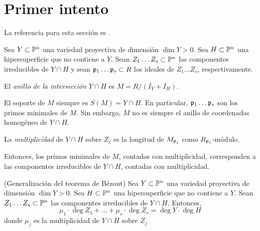 \section{Primer intento}

\noindent La referencia para esta sección es \cite[pp. 53-54]{hartshorne}.

\begin{preliminaries}
Sea $Y \subset \P^n$ una variedad proyectiva de dimensión $\dim Y > 0$. Sea $H \subset \P^n$ una hipersuperficie que no contiene a $Y$. Sean $Z_1 \dots Z_s \subset \P^n$ las componentes irreducibles de $Y \cap H$ y sean $\p_1 \dots \p_s \subset R$ los ideales de $Z_1 \dots Z_s$, respectivamente.
\end{preliminaries}

\begin{definition}
El \textit{anillo de la intersección} $Y \cap H$ es $M = R / (I_Y + I_H)$.
\end{definition}

\begin{remark}
El soporte de $M$ siempre es $S(M) = Y \cap H$. En particular, $\p_1 \dots \p_s$ son los primos minimales de $M$. Sin embargo, $M$ no es siempre el anillo de coordenadas homogéneo de $Y \cap H$.
\end{remark}

\begin{definition}
La \textit{multiplicidad} de $Y \cap H$ sobre $Z_j$ es la longitud de $M_{\p_j}$ como $R_{\p_j}$-módulo.
\end{definition}

\begin{remark}
Entonces, los primos minimales de $M$, contados con multiplicidad, corresponden a las componentes irreducibles de $Y \cap H$, contadas con multiplicidad.
\end{remark}

\begin{theorem}
(Generalización del teorema de Bézout) Sea $Y \subset \P^n$ una variedad proyectiva de dimensión $\dim Y > 0$. Sea $H \subset \P^n$ una hipersuperficie que no contiene a $Y$. Sean $Z_1 \dots Z_s \subset \P^n$ las componentes irreducibles de $Y \cap H$. Entonces,
$$\mu_1 \cdot \deg Z_1 + \dots + \mu_s \cdot \deg Z_s = \deg Y \cdot \deg H$$
donde $\mu_j$ es la multiplicidad de $Y \cap H$ sobre $Z_j$
\end{theorem}


